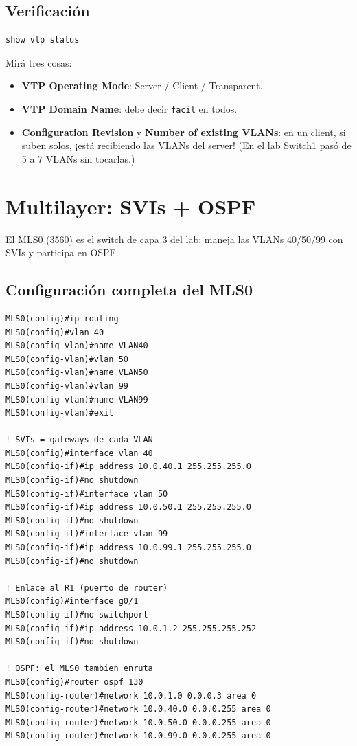 \documentclass[11pt,a4paper]{report}
\begin{document}
\section{Verificación}

\begin{lstlisting}
show vtp status
\end{lstlisting}

Mirá tres cosas:
\begin{itemize}
  \item \textbf{VTP Operating Mode}: Server / Client / Transparent.
  \item \textbf{VTP Domain Name}: debe decir \texttt{facil} en todos.
  \item \textbf{Configuration Revision} y \textbf{Number of existing VLANs}: en un client, si suben solos, ¡está recibiendo las VLANs del server! (En el lab Switch1 pasó de 5 a 7 VLANs sin tocarlas.)
\end{itemize}

\chapter{Multilayer: SVIs + OSPF}

El MLS0 (3560) es el switch de capa 3 del lab: maneja las VLANs 40/50/99 con SVIs y participa en OSPF.

\section{Configuración completa del MLS0}

\begin{lstlisting}
MLS0(config)#ip routing
MLS0(config)#vlan 40
MLS0(config-vlan)#name VLAN40
MLS0(config-vlan)#vlan 50
MLS0(config-vlan)#name VLAN50
MLS0(config-vlan)#vlan 99
MLS0(config-vlan)#name VLAN99
MLS0(config-vlan)#exit

! SVIs = gateways de cada VLAN
MLS0(config)#interface vlan 40
MLS0(config-if)#ip address 10.0.40.1 255.255.255.0
MLS0(config-if)#no shutdown
MLS0(config-if)#interface vlan 50
MLS0(config-if)#ip address 10.0.50.1 255.255.255.0
MLS0(config-if)#no shutdown
MLS0(config-if)#interface vlan 99
MLS0(config-if)#ip address 10.0.99.1 255.255.255.0
MLS0(config-if)#no shutdown

! Enlace al R1 (puerto de router)
MLS0(config)#interface g0/1
MLS0(config-if)#no switchport
MLS0(config-if)#ip address 10.0.1.2 255.255.255.252
MLS0(config-if)#no shutdown

! OSPF: el MLS0 tambien enruta
MLS0(config)#router ospf 130
MLS0(config-router)#network 10.0.1.0 0.0.0.3 area 0
MLS0(config-router)#network 10.0.40.0 0.0.0.255 area 0
MLS0(config-router)#network 10.0.50.0 0.0.0.255 area 0
MLS0(config-router)#network 10.0.99.0 0.0.0.255 area 0
\end{lstlisting}
\end{document}
